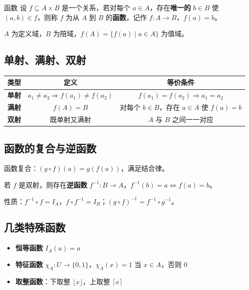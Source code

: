 \begin{mydefinition}{函数}
设 $f \subseteq A \times B$ 是一个关系，若对每个 $a \in A$，存在\textbf{唯一的} $b \in B$ 使 $(a,b) \in f$，则称 $f$ 为从 $A$ 到 $B$ 的\textbf{函数}，记作 $f: A \to B$，$f(a)=b$。
\end{mydefinition}

$A$ 为定义域，$B$ 为陪域，$f(A) = \{f(a) \mid a \in A\}$ 为值域。

\subsection{单射、满射、双射}

\begin{center}
\begin{tabular}{c|c|c}
\toprule
类型 & 定义 & 等价条件 \\
\midrule
\textbf{单射} & $a_1 \neq a_2 \Rightarrow f(a_1) \neq f(a_2)$ & $f(a_1)=f(a_2) \Rightarrow a_1=a_2$ \\
\textbf{满射} & $f(A) = B$ & 对每个 $b \in B$，存在 $a \in A$ 使 $f(a)=b$ \\
\textbf{双射} & 既单射又满射 & $A$ 与 $B$ 之间一一对应 \\
\bottomrule
\end{tabular}
\end{center}

\subsection{函数的复合与逆函数}

函数复合：$(g \circ f)(a) = g(f(a))$，满足结合律。

若 $f$ 是双射，则存在\textbf{逆函数} $f^{-1}: B \to A$，$f^{-1}(b) = a \iff f(a) = b$。

性质：$f^{-1} \circ f = I_A$，$f \circ f^{-1} = I_B$；$(g \circ f)^{-1} = f^{-1} \circ g^{-1}$。

\subsection{几类特殊函数}

\begin{itemize}
\item \textbf{恒等函数} $I_A(a) = a$
\item \textbf{特征函数} $\chi_A: U \to \{0,1\}$，$\chi_A(x) = 1$ 当 $x \in A$，否则 $0$
\item \textbf{取整函数}：下取整 $\lfloor x \rfloor$，上取整 $\lceil x \rceil$
\end{itemize}

